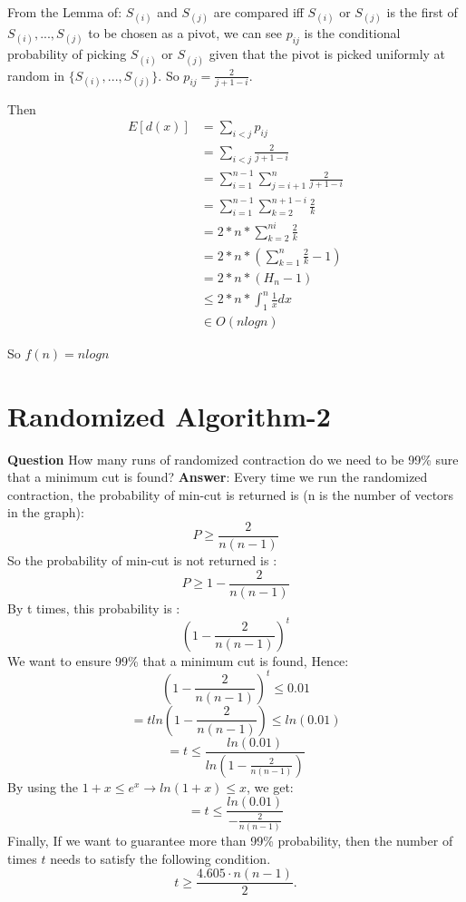 \documentclass[12pt]{article}
\begin{document}
From the Lemma of: $S_{(i)}$ and $S_{(j)}$ are compared iff $S_{(i)}$ or $S_{(j)}$ is the first of $S_{(i)}, ..., S_{(j)}$ to be chosen as a pivot, we can see $p_{ij}$ is the conditional probability of picking $S_{(i)}$ or $S_{(j)}$
 given that the pivot is picked uniformly at random in $\{S_{(i)}, ..., S_{(j)}\}$. So $p_{ij} = \frac{2}{j+1-i}$.
 
 Then 
\begin{equation}
\begin{aligned}
E[d(x)] &=  \sum_{i<j} p_{ij} \\
&=  \sum_{i<j}  \frac{2}{j+1-i}\\
&= \sum_{i=1}^{n-1} \sum_{j=i+1}^{n}  \frac{2}{j+1-i}\\
&= \sum_{i=1}^{n-1} \sum_{k=2}^{n+1-i}  \frac{2}{k}\\
&= 2*n*\sum_{k=2}^{ni}  \frac{2}{k}\\
&= 2*n*(\sum_{k=1}^{n}  \frac{2}{k}-1)\\
&=2*n*(H_{n}-1)\\
&\leq 2*n* \int_{1}^{n} \frac{1}{x} dx \\
&\in O(nlogn)
\end{aligned}
\end{equation}

So $f(n)= nlogn$
\section{Randomized Algorithm-2}
\textbf{Question}
How many runs of randomized contraction do we need to be 99\% sure that a minimum cut is found?
\textbf{Answer}:
Every time we run the randomized contraction, the probability of min-cut is returned is (n is the number of vectors in the graph):
\[P\geq\frac{2}{n(n-1)}\]
So the probability of min-cut is not returned is :
\[P\geq1-\frac{2}{n(n-1)}\]
By t times, this probability is :
\[(1-\frac{2}{n(n-1)})^t\]
We want to ensure 99\% that a minimum cut is found, Hence:
\[(1-\frac{2}{n(n-1)})^t\leq0.01\]
\[=tln(1-\frac{2}{n(n-1)})\leq ln(0.01)\]
\[=t\leq \frac{ln(0.01)}{ln(1-\frac{2}{n(n-1)})}\]
By using the \(1+x\leq e^x \rightarrow ln(1+x)\leq x\), we get:
\[=t\leq \frac{ln(0.01)}{-\frac{2}{n(n-1)}}\]
Finally, If we want to guarantee more than 99\% probability, then the number of times \(t\) needs to satisfy the following condition.
\[
t \geq \frac{4.605 \cdot n(n - 1)}{2}.
\]
\end{document}
